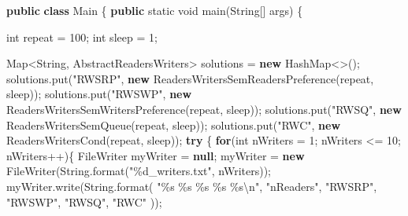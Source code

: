 \documentclass[
]{article}
\newenvironment{Shaded}{\begin{snugshade}}{\end{snugshade}}
\newcommand{\BuiltInTok}[1]{#1}
\newcommand{\DataTypeTok}[1]{\textcolor[rgb]{0.13,0.29,0.53}{#1}}
\newcommand{\DecValTok}[1]{\textcolor[rgb]{0.00,0.00,0.81}{#1}}
\newcommand{\FunctionTok}[1]{\textcolor[rgb]{0.00,0.00,0.00}{#1}}
\newcommand{\KeywordTok}[1]{\textcolor[rgb]{0.13,0.29,0.53}{\textbf{#1}}}
\newcommand{\NormalTok}[1]{#1}
\newcommand{\SpecialCharTok}[1]{\textcolor[rgb]{0.00,0.00,0.00}{#1}}
\newcommand{\StringTok}[1]{\textcolor[rgb]{0.31,0.60,0.02}{#1}}
\begin{document}
\begin{Shaded}
\begin{Highlighting}[]
\KeywordTok{public} \KeywordTok{class}\NormalTok{ Main \{}
    \KeywordTok{public} \DataTypeTok{static} \DataTypeTok{void} \FunctionTok{main}\NormalTok{(}\BuiltInTok{String}\NormalTok{[] args) \{}

        \DataTypeTok{int}\NormalTok{ repeat = }\DecValTok{100}\NormalTok{;}
        \DataTypeTok{int}\NormalTok{ sleep = }\DecValTok{1}\NormalTok{;}

        \BuiltInTok{Map}\NormalTok{\textless{}}\BuiltInTok{String}\NormalTok{, AbstractReadersWriters\textgreater{} solutions = }\KeywordTok{new} \BuiltInTok{HashMap}\NormalTok{\textless{}\textgreater{}();}
\NormalTok{        solutions.}\FunctionTok{put}\NormalTok{(}\StringTok{"RWSRP"}\NormalTok{, }\KeywordTok{new} \FunctionTok{ReadersWritersSemReadersPreference}\NormalTok{(repeat, sleep));}
\NormalTok{        solutions.}\FunctionTok{put}\NormalTok{(}\StringTok{"RWSWP"}\NormalTok{, }\KeywordTok{new} \FunctionTok{ReadersWritersSemWritersPreference}\NormalTok{(repeat, sleep));}
\NormalTok{        solutions.}\FunctionTok{put}\NormalTok{(}\StringTok{"RWSQ"}\NormalTok{, }\KeywordTok{new} \FunctionTok{ReadersWritersSemQueue}\NormalTok{(repeat, sleep));}
\NormalTok{        solutions.}\FunctionTok{put}\NormalTok{(}\StringTok{"RWC"}\NormalTok{, }\KeywordTok{new} \FunctionTok{ReadersWritersCond}\NormalTok{(repeat, sleep));}
        \KeywordTok{try}\NormalTok{ \{}
            \KeywordTok{for}\NormalTok{(}\DataTypeTok{int}\NormalTok{ nWriters = }\DecValTok{1}\NormalTok{; nWriters \textless{}= }\DecValTok{10}\NormalTok{; nWriters++)\{}
                \BuiltInTok{FileWriter}\NormalTok{ myWriter = }\KeywordTok{null}\NormalTok{;}
\NormalTok{                myWriter = }\KeywordTok{new} \BuiltInTok{FileWriter}\NormalTok{(}\BuiltInTok{String}\FunctionTok{.format}\NormalTok{(}\StringTok{"}\SpecialCharTok{\%d}\StringTok{\_writers.txt"}\NormalTok{, nWriters));}
\NormalTok{                myWriter.}\FunctionTok{write}\NormalTok{(}\BuiltInTok{String}\FunctionTok{.format}\NormalTok{(}
                        \StringTok{"}\SpecialCharTok{\%s}\StringTok{ }\SpecialCharTok{\%s}\StringTok{ }\SpecialCharTok{\%s}\StringTok{ }\SpecialCharTok{\%s}\StringTok{ }\SpecialCharTok{\%s\textbackslash{}n}\StringTok{"}\NormalTok{,}
                        \StringTok{"nReaders"}\NormalTok{,}
                        \StringTok{"RWSRP"}\NormalTok{,}
                        \StringTok{"RWSWP"}\NormalTok{,}
                        \StringTok{"RWSQ"}\NormalTok{,}
                        \StringTok{"RWC"}
\NormalTok{                ));}


\end{Highlighting}
\end{Shaded}
\end{document}
